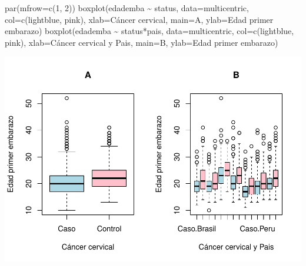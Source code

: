 \documentclass[
]{book}
\newenvironment{Shaded}{\begin{snugshade}}{\end{snugshade}}
\newcommand{\AttributeTok}[1]{\textcolor[rgb]{0.77,0.63,0.00}{#1}}
\newcommand{\DecValTok}[1]{\textcolor[rgb]{0.00,0.00,0.81}{#1}}
\newcommand{\FunctionTok}[1]{\textcolor[rgb]{0.00,0.00,0.00}{#1}}
\newcommand{\NormalTok}[1]{#1}
\newcommand{\SpecialCharTok}[1]{\textcolor[rgb]{0.00,0.00,0.00}{#1}}
\newcommand{\StringTok}[1]{\textcolor[rgb]{0.31,0.60,0.02}{#1}}
\begin{document}
\begin{Shaded}
\begin{Highlighting}[]
\FunctionTok{par}\NormalTok{(}\AttributeTok{mfrow=}\FunctionTok{c}\NormalTok{(}\DecValTok{1}\NormalTok{, }\DecValTok{2}\NormalTok{))}
\FunctionTok{boxplot}\NormalTok{(edademba }\SpecialCharTok{\textasciitilde{}}\NormalTok{ status, }\AttributeTok{data=}\NormalTok{multicentric,}
        \AttributeTok{col=}\FunctionTok{c}\NormalTok{(}\StringTok{\textquotesingle{}lightblue\textquotesingle{}}\NormalTok{, }\StringTok{\textquotesingle{}pink\textquotesingle{}}\NormalTok{),}
        \AttributeTok{xlab=}\StringTok{\textquotesingle{}Cáncer cervical\textquotesingle{}}\NormalTok{, }\AttributeTok{main=}\StringTok{\textquotesingle{}A\textquotesingle{}}\NormalTok{,}
        \AttributeTok{ylab=}\StringTok{\textquotesingle{}Edad primer embarazo\textquotesingle{}}\NormalTok{)}
\FunctionTok{boxplot}\NormalTok{(edademba }\SpecialCharTok{\textasciitilde{}}\NormalTok{ status}\SpecialCharTok{*}\NormalTok{pais, }\AttributeTok{data=}\NormalTok{multicentric,}
        \AttributeTok{col=}\FunctionTok{c}\NormalTok{(}\StringTok{\textquotesingle{}lightblue\textquotesingle{}}\NormalTok{, }\StringTok{\textquotesingle{}pink\textquotesingle{}}\NormalTok{),}
        \AttributeTok{xlab=}\StringTok{\textquotesingle{}Cáncer cervical y Pais\textquotesingle{}}\NormalTok{, }\AttributeTok{main=}\StringTok{\textquotesingle{}B\textquotesingle{}}\NormalTok{,}
        \AttributeTok{ylab=}\StringTok{\textquotesingle{}Edad primer embarazo\textquotesingle{}}\NormalTok{)}
\end{Highlighting}
\end{Shaded}

\includegraphics{fig/unnamed-chunk-79-1.pdf}
\end{document}
